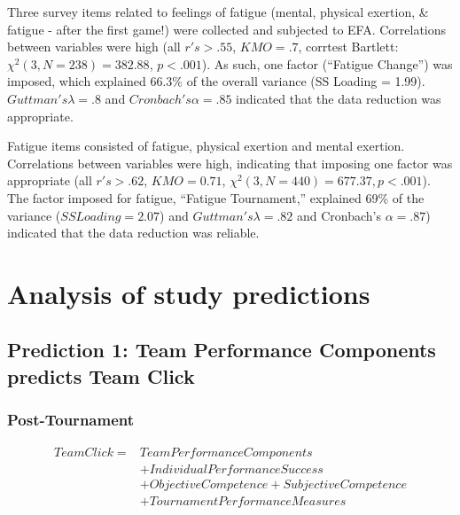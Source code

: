Three survey items related to feelings of fatigue (mental, physical exertion, & fatigue - after the first game!)  were collected and subjected to EFA.
Correlations between variables were high (all $r's > .55$, $KMO = .7$, corrtest Bartlett: $\chi^2(3, N = 238) = 382.88$, $p < .001$).  As such, one factor (``Fatigue Change'') was imposed, which explained 66.3\% of the overall variance (SS Loading = 1.99).  $Guttman's \lambda =.8$ and $Cronbach's \alpha = .85$ indicated that the data reduction was appropriate.

Fatigue items consisted of fatigue, physical exertion and mental exertion. Correlations between variables were high, indicating that imposing one factor was appropriate (all $r's > .62$, $KMO = 0.71$, $\chi^2(3, N = 440) =  677.37, p < .001$).  The factor imposed for fatigue, ``Fatigue Tournament,'' explained 69\% of the variance ($SS Loading = 2.07$) and $Guttman's \lambda =.82$ and Cronbach's $\alpha = .87$) indicated that the data reduction was reliable.






























 \section{Analysis of study predictions\label{app8:analysisPredictions}}



 \subsection{Prediction 1: Team Performance Components predicts Team Click}


 \subsubsection{Post-Tournament}

 \begin{equation}
   \begin{align*}
     Team Click =  & Team Performance Components\\
               & + Individual Performance Success \\
               & + Objective Competence + Subjective Competence\\
               & + TournamentPerformanceMeasures \\
   \end{align*}
 \end{equation}
 \bigskip


